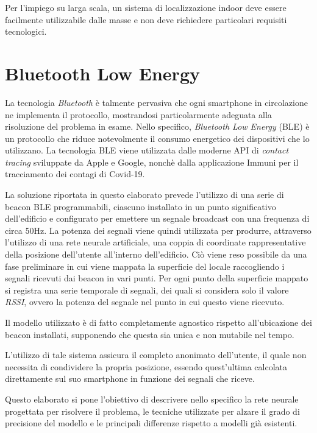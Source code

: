 \documentclass[draft]{standalone}
\begin{document}
Per l'impiego su larga scala, un sistema di localizzazione indoor deve essere
facilmente utilizzabile dalle masse e non deve richiedere particolari requisiti
tecnologici.

\section{Bluetooth Low Energy}
La tecnologia \emph{Bluetooth} è talmente pervasiva che ogni smartphone in
circolazione ne implementa il protocollo, mostrandosi particolarmente adeguata
alla risoluzione del problema in esame. Nello specifico, \emph{Bluetooth Low
  Energy} (BLE) è un protocollo che riduce notevolmente il consumo energetico
dei dispositivi che lo utilizzano. La tecnologia BLE viene utilizzata dalle
moderne API di \emph{contact tracing} sviluppate da Apple e Google, nonchè
dalla applicazione Immuni\cite{immuni} per il tracciamento dei contagi di
Covid-19\cite{apple-google}.

La soluzione riportata in questo elaborato prevede l'utilizzo di una serie di
beacon BLE programmabili, ciascuno installato in un punto significativo
dell'edificio e configurato per emettere un segnale broadcast con una frequenza
di circa 50Hz. La potenza dei segnali viene quindi utilizzata per produrre,
attraverso l'utilizzo di una rete neurale artificiale, una coppia di coordinate
rappresentative della posizione dell'utente all'interno dell'edificio. Ciò
viene reso possibile da una fase preliminare in cui viene mappata la superficie
del locale raccogliendo i segnali ricevuti dai beacon in vari punti. Per ogni
punto della superficie mappato si registra una serie temporale di segnali, dei
quali si considera solo il valore \emph{RSSI}, ovvero la potenza del segnale
nel punto in cui questo viene ricevuto.

Il modello utilizzato è di fatto completamente agnostico rispetto
all'ubicazione dei beacon installati, supponendo che questa sia unica e non
mutabile nel tempo.

L'utilizzo di tale sistema assicura il completo anonimato dell'utente, il quale
non necessita di condividere la propria posizione, essendo quest'ultima
calcolata direttamente sul suo smartphone in funzione dei segnali che riceve.

Questo elaborato si pone l'obiettivo di descrivere nello specifico la rete
neurale progettata per risolvere il problema, le tecniche utilizzate per alzare
il grado di precisione del modello e le principali differenze rispetto a
modelli già esistenti.

\end{document}
